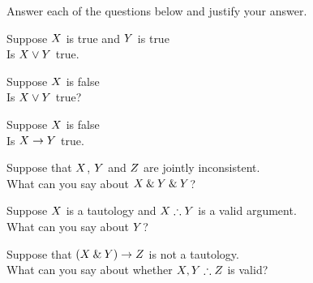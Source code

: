 \solutions
\problempart
\label{pr.TT.concepts}
Answer each of the questions below and justify your answer.
\begin{earg}
\item Suppose $X$ is true and $Y$ is true\\Is $X\vee Y$ true.\myanswer{\\true}
\item Suppose $X$ is false \\Is $X\vee Y$ true?
\item Suppose $X$ is false \\Is $X\rightarrow Y$ true. \myanswer{\\true}
\item Suppose that $X$, $Y$ and $Z$  are jointly inconsistent. \\What can you say about $X\mathbin{\&}Y\mathbin{\&}Y$?
\item Suppose $X$ is a tautology and  $\metaX\therefore\metaY$ is a valid argument. \\What can you say about $Y$?
\item Suppose that $(X\mathbin{\&}Y)\rightarrow Z$ is not a tautology.\\ What can you say about whether $\metaX, \metaY \therefore\metaZ$ is valid?

\end{earg}
